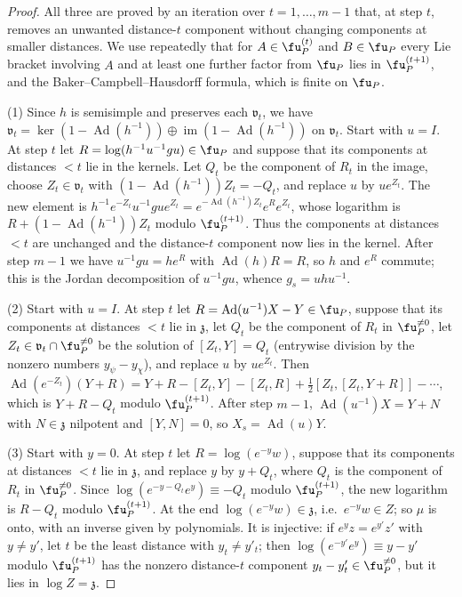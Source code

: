 \begin{proof}
All three are proved by an iteration over $t=1,\ldots,m-1$ that, at step $t$, removes an unwanted
distance-$t$ component without changing components at smaller distances. We use repeatedly that for
$A\in\fu_P^{(t)}$ and $B\in\fu_P$ every Lie bracket involving $A$ and at least one further factor
from $\fu_P$ lies in $\fu_P^{(t+1)}$, and the Baker--Campbell--Hausdorff formula, which is finite on
$\fu_P$.

(1) Since $h$ is semisimple and preserves each $\mathfrak v_t$, we have
$\mathfrak v_t=\ker(1-\operatorname{Ad}(h^{-1}))\oplus\operatorname{im}(1-\operatorname{Ad}(h^{-1}))$ on $\mathfrak v_t$. Start with $u=I$. At
step $t$ let $R=\log(h^{-1}u^{-1}gu)\in\fu_P$ and suppose that its components at distances $<t$ lie in
the kernels. Let $Q_t$ be the component of $R_t$ in the image, choose $Z_t\in\mathfrak v_t$ with
$(1-\operatorname{Ad}(h^{-1}))Z_t=-Q_t$, and replace $u$ by $ue^{Z_t}$. The new element is
$h^{-1}e^{-Z_t}u^{-1}gue^{Z_t}=e^{-\operatorname{Ad}(h^{-1})Z_t}e^{R}e^{Z_t}$, whose logarithm is
$R+(1-\operatorname{Ad}(h^{-1}))Z_t$ modulo $\fu_P^{(t+1)}$. Thus the components at distances $<t$ are
unchanged and the distance-$t$ component now lies in the kernel. After step $m-1$ we have
$u^{-1}gu=he^R$ with $\operatorname{Ad}(h)R=R$, so $h$ and $e^R$ commute; this is the Jordan decomposition of
$u^{-1}gu$, whence $g_s=uhu^{-1}$.

(2) Start with $u=I$. At step $t$ let $R=\operatorname{Ad}(u^{-1})X-Y\in\fu_P$, suppose that its components at
distances $<t$ lie in $\mathfrak z$, let $Q_t$ be the component of $R_t$ in $\fu_P^{\ne0}$, let
$Z_t\in\mathfrak v_t\cap\fu_P^{\ne0}$ be the solution of $[Z_t,Y]=Q_t$ (entrywise division by the nonzero
numbers $y_\psi-y_\chi$), and replace $u$ by $ue^{Z_t}$. Then
$\operatorname{Ad}(e^{-Z_t})(Y+R)=Y+R-[Z_t,Y]-[Z_t,R]+\tfrac12[Z_t,[Z_t,Y+R]]-\cdots$, which is
$Y+R-Q_t$ modulo $\fu_P^{(t+1)}$. After step $m-1$, $\operatorname{Ad}(u^{-1})X=Y+N$ with $N\in\mathfrak z$
nilpotent and $[Y,N]=0$, so $X_s=\operatorname{Ad}(u)Y$.

(3) Start with $y=0$. At step $t$ let $R=\log(e^{-y}w)$, suppose that its components at distances
$<t$ lie in $\mathfrak z$, and replace $y$ by $y+Q_t$, where $Q_t$ is the component of $R_t$ in
$\fu_P^{\ne0}$. Since $\log(e^{-y-Q_t}e^{y})\equiv-Q_t$ modulo $\fu_P^{(t+1)}$, the new logarithm is
$R-Q_t$ modulo $\fu_P^{(t+1)}$. At the end $\log(e^{-y}w)\in\mathfrak z$, i.e.\ $e^{-y}w\in Z$; so $\mu$
is onto, with an inverse given by polynomials. It is injective: if $e^{y}z=e^{y'}z'$ with $y\ne y'$,
let $t$ be the least distance with $y_t\ne y'_t$; then $\log(e^{-y'}e^{y})\equiv y-y'$ modulo
$\fu_P^{(t+1)}$ has the nonzero distance-$t$ component $y_t-y'_t\in\fu_P^{\ne0}$, but it lies in
$\log Z=\mathfrak z$.


\end{proof}
